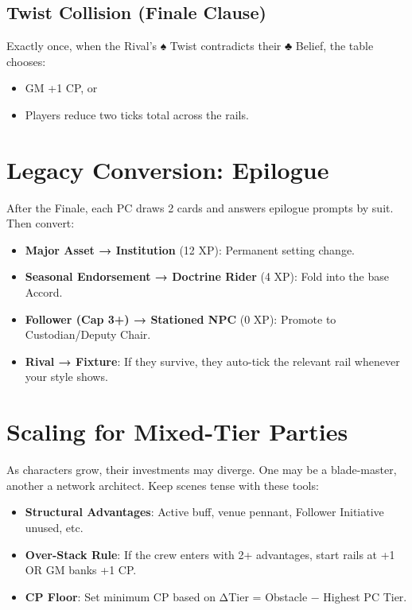 \subsection*{Twist Collision (Finale Clause)}

Exactly once, when the Rival’s ♠ Twist contradicts their ♣ Belief, the table chooses:

\begin{itemize}
    \item GM +1 CP, or
    \item Players reduce two ticks total across the rails.
\end{itemize}

\section*{Legacy Conversion: Epilogue}

After the Finale, each PC draws 2 cards and answers epilogue prompts by suit. Then convert:

\begin{itemize}
    \item \textbf{Major Asset → Institution} (12 XP): Permanent setting change.
    \item \textbf{Seasonal Endorsement → Doctrine Rider} (4 XP): Fold into the base Accord.
    \item \textbf{Follower (Cap 3+) → Stationed NPC} (0 XP): Promote to Custodian/Deputy Chair.
    \item \textbf{Rival → Fixture}: If they survive, they auto-tick the relevant rail whenever your style shows.
\end{itemize}

\section*{Scaling for Mixed-Tier Parties}

As characters grow, their investments may diverge. One may be a blade-master, another a network architect. Keep scenes tense with these tools:

\begin{itemize}
    \item \textbf{Structural Advantages}: Active buff, venue pennant, Follower Initiative unused, etc.
    \item \textbf{Over-Stack Rule}: If the crew enters with 2+ advantages, start rails at +1 OR GM banks +1 CP.
    \item \textbf{CP Floor}: Set minimum CP based on ΔTier = Obstacle − Highest PC Tier.
\end{itemize}

